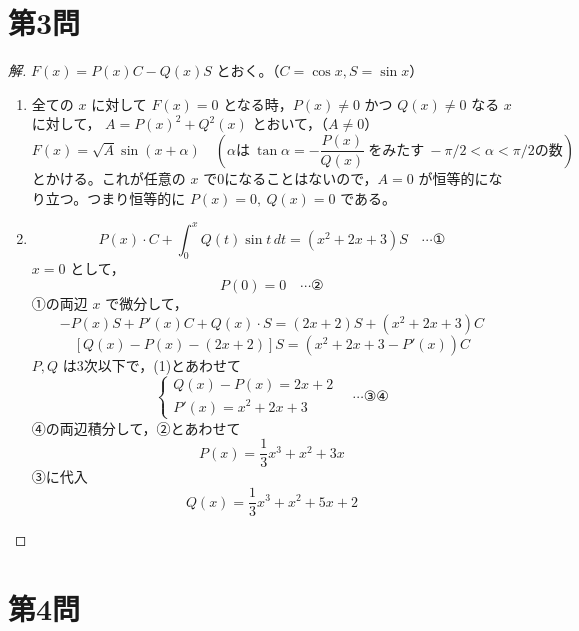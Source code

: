 \documentclass[../main.tex]{subfiles}
\begin{document}
\newpage

\section*{第3問}

\begin{proof}[解]
  $F(x)=P(x)C-Q(x)S$ とおく。（$C=\cos x, S=\sin x$）

  \begin{enumerate}
    \item[(1)] 全ての $x$ に対して $F(x)=0$ となる時，$P(x)\ne0$ かつ $Q(x)\ne0$ なる $x$ に対して，
      $A=P(x)^2+Q^2(x)$ とおいて，（$A\ne0$）
      \[
        F(x)=\sqrt{A}\sin(x+\alpha) \quad \left(\alpha\text{は}\ \tan\alpha=-\frac{P(x)}{Q(x)}\ \text{をみたす}\ -\pi/2<\alpha<\pi/2\text{の数}\right)
      \]
      とかける。これが任意の $x$ で0になることはないので，$A=0$ が恒等的になり立つ。つまり恒等的に $P(x)=0,\ Q(x)=0$ である。

    \item[(2)]
      \[
        P(x)\cdot C+\int_0^xQ(t)\sin t\,dt=(x^2+2x+3)S \quad \cdots \text{①}
      \]
      $x=0$ として，
      \[
        P(0)=0 \quad \cdots \text{②}
      \]
      ①の両辺 $x$ で微分して，
      \[
        -P(x)S+P'(x)C+Q(x)\cdot S=(2x+2)S+(x^2+2x+3)C
      \]
      \[
        [Q(x)-P(x)-(2x+2)]S=(x^2+2x+3-P'(x))C
      \]
      $P,Q$ は3次以下で，(1)とあわせて
      \[
        \begin{cases}
          Q(x)-P(x)=2x+2 \\
          P'(x)=x^2+2x+3
        \end{cases}
        \quad \cdots \text{③④}
      \]
      ④の両辺積分して，②とあわせて
      \[
        P(x)=\frac13x^3+x^2+3x
      \]
      ③に代入
      \[
        Q(x)=\frac13x^3+x^2+5x+2
      \]
  \end{enumerate}
\end{proof}

\newpage

\section*{第4問}
\end{document}

